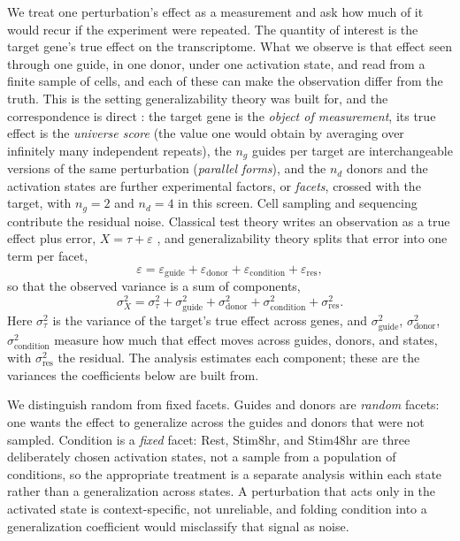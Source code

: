 \documentclass[11pt]{article}
\begin{document}
We treat one perturbation's effect as a measurement and ask how much of it would
recur if the experiment were repeated. The quantity of interest is the target
gene's true effect on the transcriptome. What we observe is that effect seen
through one guide, in one donor, under one activation state, and read from a
finite sample of cells, and each of these can make the observation differ from the
truth. This is the setting generalizability theory was built for, and the
correspondence is direct \parencite{lordnovick1968}: the target gene is the
\emph{object of measurement}, its true effect is the \emph{universe score} (the
value one would obtain by averaging over infinitely many independent repeats), the
$n_g$ guides per target are interchangeable versions of the same perturbation
(\emph{parallel forms}), and the $n_d$ donors and the activation states are further
experimental factors, or \emph{facets}, crossed with the target, with $n_g = 2$ and
$n_d = 4$ in this screen. Cell sampling and sequencing contribute the residual noise. Classical test theory writes an observation as a true effect plus
error, $X = \tau + \varepsilon$ \parencite{novick1966}, and generalizability theory
\parencite{cronbach1972} splits that error into one term per facet,
\[
\varepsilon = \varepsilon_{\mathrm{guide}} + \varepsilon_{\mathrm{donor}}
      + \varepsilon_{\mathrm{condition}} + \varepsilon_{\mathrm{res}},
\]
so that the observed variance is a sum of components,
\[
\sigma^2_X = \sigma^2_\tau + \sigma^2_{\mathrm{guide}} + \sigma^2_{\mathrm{donor}}
      + \sigma^2_{\mathrm{condition}} + \sigma^2_{\mathrm{res}}.
\]
Here $\sigma^2_\tau$ is the variance of the target's true effect across genes, and
$\sigma^2_{\mathrm{guide}}$, $\sigma^2_{\mathrm{donor}}$, $\sigma^2_{\mathrm{condition}}$
measure how much that effect moves across guides, donors, and states, with
$\sigma^2_{\mathrm{res}}$ the residual. The analysis estimates each component; these
are the variances the coefficients below are built from.

We distinguish random from fixed facets. Guides and donors are \emph{random} facets: one wants the
effect to generalize across the guides and donors that were not sampled.
Condition is a \emph{fixed} facet: Rest, Stim8hr, and Stim48hr are three
deliberately chosen activation states, not a sample from a population of
conditions, so the appropriate treatment is a separate analysis within each state
rather than a generalization across states. A perturbation that acts only in the
activated state is context-specific, not unreliable, and folding condition into a
generalization coefficient would misclassify that signal as noise.
\end{document}
